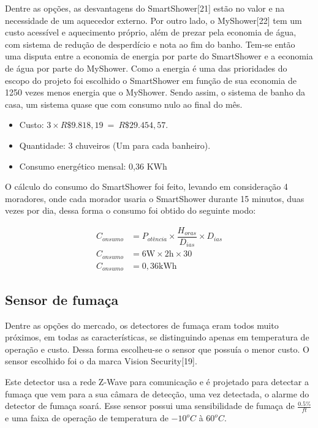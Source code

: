 Dentre as opções, as desvantagens do SmartShower[21] estão no valor e na necessidade de um aquecedor externo. Por outro lado, o MyShower[22] tem um custo acessível e aquecimento próprio, além de prezar pela economia de água, com sistema de redução de desperdício e nota ao fim do banho. Tem-se então uma disputa entre a economia de energia por parte do SmartShower e a economia de água por parte do MyShower. Como a energia é uma das prioridades do escopo do projeto foi escolhido o SmartShower em função de sua economia de 1250 vezes menos energia que o MyShower. Sendo assim, o sistema de banho da casa, um sistema quase que com consumo nulo ao final do mês.

\begin{itemize}
\item Custo: $3\times R\$ 9.818,19\ =\ R\$ 29.454,57.$
\item Quantidade: 3 chuveiros (Um para cada banheiro).
\item Consumo energético mensal: 0,36 KWh
\end{itemize}

	O cálculo do consumo do SmartShower foi feito, levando em consideração 4 moradores, onde cada morador usaria o SmartShower durante 15 minutos, duas vezes por dia, dessa forma o consumo foi obtido do seguinte modo: 

	\begin{equation} \label{consumo_energetico_mensal} \tag{e.q. consumo energético mensal}
	\begin{split}
	C_{onsumo} &= P_{otência}\times \dfrac{H_{oras}}{D_{ias}}\times D_{ias}\\
	C_{onsumo} &= 6 \si{\watt}\times 2\si{\hour}\times 30\\
	C_{onsumo} &= 0,36 \si{\kilo\watt\hour}
	\end{split}
	\end{equation}

\subsection{Sensor de fumaça}

	Dentre as opções do mercado, os detectores de fumaça eram todos muito próximos, em todas as características, se distinguindo apenas em temperatura de operação e custo. Dessa forma escolheu-se o sensor que possuía o menor custo. O sensor escolhido foi o da marca Vision Security[19].

	 Este detector usa a rede Z-Wave para comunicação e é projetado para detectar a fumaça que vem para a sua  câmara de detecção, uma vez detectada, o alarme do detector de fumaça soará. Esse sensor possui uma sensibilidade de fumaça de $\tfrac{0.5\%}{ft}$ e uma faixa de operação de temperatura de $-10^oC$ à $60^oC$.

